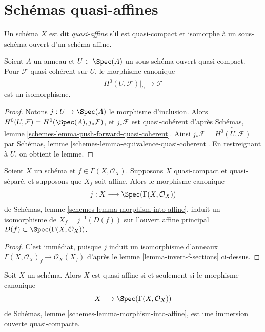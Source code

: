 \section{Schémas quasi-affines}
\label{section-quasi-affine}

\begin{definition}
\label{definition-quasi-affine}
Un schéma $X$ est dit {\it quasi-affine} s'il est quasi-compact
et isomorphe à un sous-schéma ouvert d'un schéma affine.
\end{definition}

\begin{lemma}
\label{lemma-quasi-coherent-quasi-affine}
Soient $A$ un anneau et $U \subset \Spec(A)$ un sous-schéma
ouvert quasi-compact. Pour $\mathcal{F}$ quasi-cohérent sur $U$, le morphisme canonique
$$
\widetilde{H^0(U, \mathcal{F})}|_U \to \mathcal{F}
$$
est un isomorphisme.
\end{lemma}

\begin{proof}
Notons $j : U \to \Spec(A)$ le morphisme d'inclusion. Alors
$H^0(U, \mathcal{F}) = H^0(\Spec(A), j_*\mathcal{F})$, et
$j_*\mathcal{F}$ est quasi-cohérent
d'après Schémas, lemme \ref{schemes-lemma-push-forward-quasi-coherent}.
Ainsi $j_*\mathcal{F} = \widetilde{H^0(U, \mathcal{F})}$ par
Schémas, lemme \ref{schemes-lemma-equivalence-quasi-coherent}.
En restreignant à $U$, on obtient le lemme.
\end{proof}

\begin{lemma}
\label{lemma-invert-f-affine}
Soient $X$ un schéma et $f \in \Gamma(X, \mathcal{O}_X)$.
Supposons $X$ quasi-compact et quasi-séparé, et supposons que
$X_f$ soit affine. Alors le morphisme canonique
$$
j : X \longrightarrow \Spec(\Gamma(X, \mathcal{O}_X))
$$
de Schémas, lemme \ref{schemes-lemma-morphism-into-affine},
induit un isomorphisme de $X_f = j^{-1}(D(f))$ sur l'ouvert affine
principal $D(f) \subset \Spec(\Gamma(X, \mathcal{O}_X))$.
\end{lemma}

\begin{proof}
C'est immédiat, puisque $j$ induit un isomorphisme d'anneaux
$\Gamma(X, \mathcal{O}_X)_f \to \mathcal{O}_X(X_f)$ d'après
le lemme \ref{lemma-invert-f-sections} ci-dessus.
\end{proof}

\begin{lemma}
\label{lemma-quasi-affine}
Soit $X$ un schéma. Alors $X$ est quasi-affine si et seulement
si le morphisme canonique
$$
X \longrightarrow \Spec(\Gamma(X, \mathcal{O}_X))
$$
de Schémas, lemme \ref{schemes-lemma-morphism-into-affine},
est une immersion ouverte quasi-compacte.
\end{lemma}

